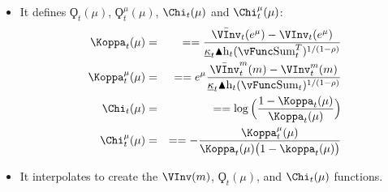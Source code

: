 \documentclass[titlepage,abstract]{\econtex}
\providecommand{\vSum}{\vFunc\text{Sum}}
\providecommand{\Deltah}{\blacktriangle \mathrm{h}}
\begin{document}
\begin{itemize}
        \item It defines $\ensuremath{\Koppa}_{t}(\mu)$, $\ensuremath{\Koppa}_{t}^{\mu}(\mu)$, $\Chi_{t}(\mu)$ and $\Chi_{t}^{\mu}(\mu)$:
            \begin{equation}\begin{gathered}\begin{aligned}
            \Koppa_{t} (\mu)   &=& =  =  \frac{\bar{\VInv}_{t} (e^{\mu}) -\VInv_{t} (e^{\mu})}{\underline{\kappa}_{t} \Deltah_{t} (\vSum_{t}^{T})^{1/(1-\rho)}} \\
            \Koppa_{t}^{\mu} (\mu)   &=& =  =  e^{\mu} \frac{\bar{\VInv}_{t}^{m} (m)- \VInv_{t}^{m} (m)}{\underline{\kappa}_{t} \Deltah_{t} (\vSum_{t})^{1/(1-\rho)}} \\
            \Chi_{t} (\mu)   &=& =  =  \log\Big(\frac{1-\Koppa_{t} (\mu)}{\Koppa_{t} (\mu) }\Big) \\
            \Chi_{t}^{\mu} (\mu)   &=& =  =  -\frac{\Koppa_{t}^{\mu}(\mu)}{\Koppa_{t} (\mu)\big(1-\koppa_{t} (\mu)\big)}
            \end{aligned}\end{gathered}\end{equation}
        \item It interpolates to create the $\VInv(m)$, $\ensuremath{\Koppa}_{t}(\mu)$, and $\Chi_{t}(\mu)$ functions.
        \end{itemize}
\end{document}
